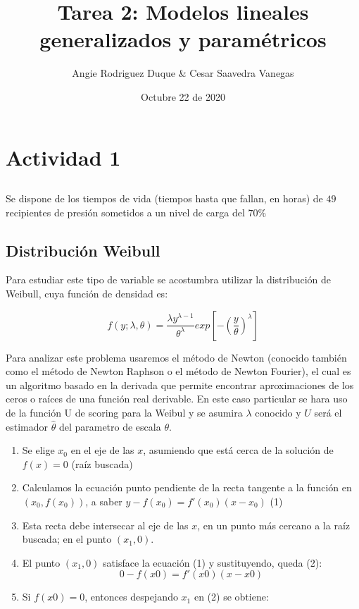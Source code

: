 \documentclass[
]{article}
\title{Tarea 2: Modelos lineales generalizados y paramétricos}
\author{Angie Rodriguez Duque \& Cesar Saavedra Vanegas}
\date{Octubre 22 de 2020}
\begin{document}
\maketitle

\hypertarget{actividad-1}{%
\section{Actividad 1}\label{actividad-1}}

\hypertarget{section}{%
\subsection{}\label{section}}

Se dispone de los tiempos de vida (tiempos hasta que fallan, en horas)
de \(49\) recipientes de presión sometidos a un nivel de carga del
\(70\%\)

\hypertarget{distribuciuxf3n-weibull}{%
\subsection{Distribución Weibull}\label{distribuciuxf3n-weibull}}

Para estudiar este tipo de variable se acostumbra utilizar la
distribución de Weibull, cuya función de densidad es:

\[f(y;\lambda,\theta)=\displaystyle\frac{\lambda y^{\lambda-1}}{\theta^{\lambda}}exp \left[-\left(\frac{y}{\theta}\right)^{\lambda}\right] \]

Para analizar este problema usaremos el método de Newton (conocido
también como el método de Newton Raphson o el método de Newton Fourier),
el cual es un algoritmo basado en la derivada que permite encontrar
aproximaciones de los ceros o raíces de una función real derivable. En
este caso particular se hara uso de la función U de scoring para la
Weibul y se asumira \(\lambda\) conocido y \(U\) será el estimador
\(\hat\theta\) del parametro de escala \(\theta\).

\begin{enumerate}
\def\labelenumi{\arabic{enumi}.}
\item
  Se elige \(x_{0}\) en el eje de las \(x\), asumiendo que está cerca de
  la solución de \(f(x)=0\) (raíz buscada)
\item
  Calculamos la ecuación punto pendiente de la recta tangente a la
  función en \((x_{0},f(x_{0}))\), a saber
  \(y−f(x_{0})=f′(x_{0})(x−x_{0})\) (1)
\item
  Esta recta debe intersecar al eje de las \(x\), en un punto más
  cercano a la raíz buscada; en el punto \((x_{1},0)\).
\item
  El punto \((x_{1},0)\) satisface la ecuación (1) y sustituyendo, queda
  (2): \[0−f(x0)=f′(x0)(x−x0)\]
\item
  Si \(f(x0)=0\), entonces despejando \(x_{1}\) en (2) se obtiene:
\end{enumerate}
\end{document}
